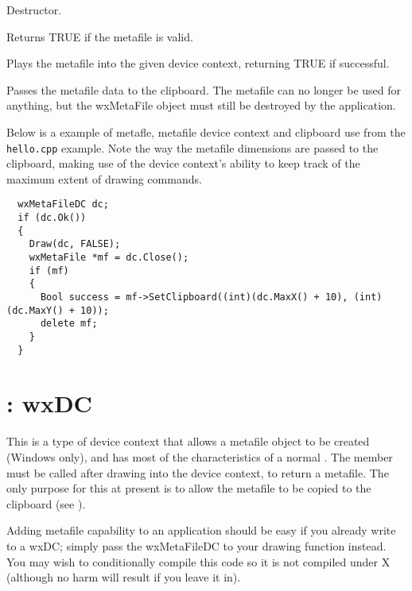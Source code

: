 

Destructor.

\label{wxmetafileok}


Returns TRUE if the metafile is valid.

\label{wxmetafileplay}


Plays the metafile into the given device context, returning
TRUE if successful.



Passes the metafile data to the clipboard. The metafile can no longer be
used for anything, but the wxMetaFile object must still be destroyed by
the application.

Below is a example of metafle, metafile device context and clipboard use
from the {\tt hello.cpp} example. Note the way the metafile dimensions
are passed to the clipboard, making use of the device context's ability
to keep track of the maximum extent of drawing commands.

\begin{verbatim}
  wxMetaFileDC dc;
  if (dc.Ok())
  {
    Draw(dc, FALSE);
    wxMetaFile *mf = dc.Close();
    if (mf)
    {
      Bool success = mf->SetClipboard((int)(dc.MaxX() + 10), (int)(dc.MaxY() + 10));
      delete mf;
    }
  }
\end{verbatim}

\section{: wxDC}\label{wxmetafiledc}

This is a type of device context that allows a metafile object to be
created (Windows only), and has most of the characteristics of a normal
. The  member must be called after drawing into the
device context, to return a metafile. The only purpose for this at
present is to allow the metafile to be copied to the clipboard (see ).

Adding metafile capability to an application should be easy if you
already write to a wxDC; simply pass the wxMetaFileDC to your drawing
function instead. You may wish to conditionally compile this code so it
is not compiled under X (although no harm will result if you leave it
in).

